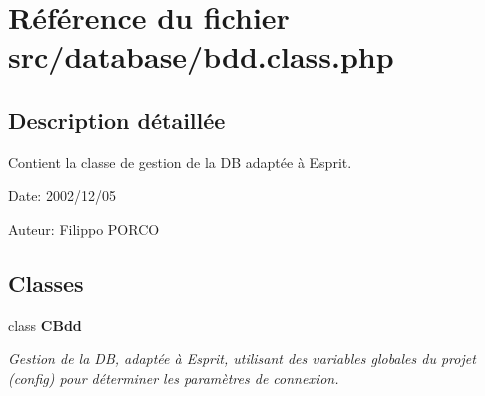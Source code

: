 \section{Référence du fichier src/database/bdd.class.php}
\label{bdd_8class_8php}


\subsection{Description détaillée}
Contient la classe de gestion de la DB adaptée à Esprit. 

\begin{Desc}
\item[Date:]2002/12/05\end{Desc}
\begin{Desc}
\item[Auteur:]Filippo PORCO \end{Desc}


\subsection*{Classes}
\begin{CompactItemize}
\item 
class {\bf CBdd}
\begin{CompactList}\small\item\em Gestion de la DB, adaptée à Esprit, utilisant des variables globales du projet (config) pour déterminer les paramètres de connexion. \item\end{CompactList}\end{CompactItemize}
